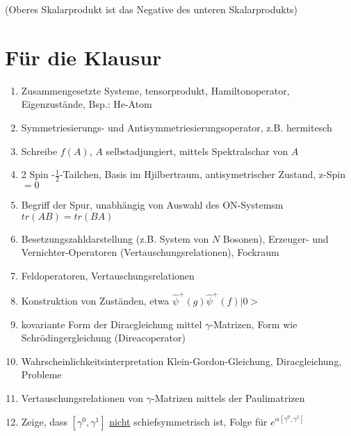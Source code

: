 \documentclass[twoside,a4paper]{scrartcl}
\renewcommand{\1}{\mathds{1}}
\begin{document}
{\begin{enumerate}
(Oberes Skalarprodukt ist das Negative des unteren Skalarprodukts)
\end{enumerate}
}{}





% 
\section{Für die Klausur}
\begin{enumerate}
\item Zusammengesetzte Systeme, tensorprodukt, Hamiltonoperator, Eigenzustände, Bsp.: He-Atom
\item Symmetriesierungs- und Antisymmetriesierungsoperator, z.B. hermitesch
\item Schreibe $f(A)$, $A$ selbstadjungiert, mittels Spektralschar von $A$
\item 2 Spin -$\frac{1}{2}$-Tailchen, Basis im Hjilbertraum, antisymetrischer Zustand, z-Spin$=0$
\item Begriff der Spur, unabhängig von Auswahl des ON-Systemsm $tr(AB)=tr(BA)$
\item Besetzungszahldarstellung (z.B. System von $N$ Bosonen), Erzeuger- und Vernichter-Operatoren (Vertauschungsrelationen), Fockraum
\item Feldoperatoren, Vertauschungsrelationen
\item Konstruktion von Zuständen, etwa $\hat \psi^+(g)\hat \psi^+(f)|0>$
\item kovariante Form der Diracgleichung mittel $\gamma$-Matrizen, Form wie Schrödingergleichung (Direacoperator)
\item Wahrscheinlichkeitsinterpretation Klein-Gordon-Gleichung, Diracgleichung, Probleme
\item Vertauschungsrelationen von $\gamma$-Matrizen mittels der Paulimatrizen
\item Zeige, dass $[\gamma^0,\gamma^1]$ \underline{nicht} schiefsymmetrisch ist, Folge für $e^{\alpha[\gamma^0,\gamma^1]}$
\end{enumerate}






\end{document}

